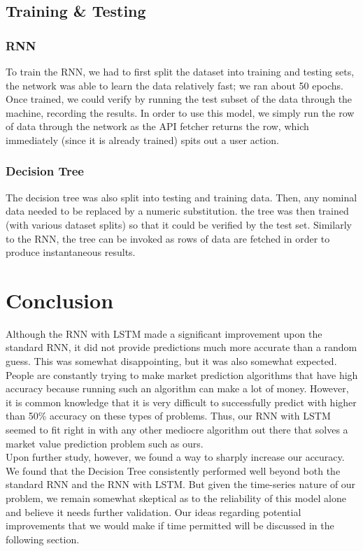 \documentclass{article}
\begin{document}
\subsection{ Training \& Testing }
\subsubsection{ RNN }
To train the RNN, we had to first split the dataset into training and testing sets, the network was able to learn the data relatively fast; we ran about 50 epochs. Once trained, we could verify by running the test subset of the data through the machine, recording the results. In order to use this model, we simply run the row of data through the network as the API fetcher returns the row, which immediately (since it is already trained) spits out a user action.\\

\subsubsection{ Decision Tree }
The decision tree was also split into testing and training data. Then, any nominal data needed to be replaced by a numeric substitution. the tree was then trained (with various dataset splits) so that it could be verified by the test set. Similarly to the RNN, the tree can be invoked as rows of data are fetched in order to produce instantaneous results. \\

\section{ Conclusion }
Although the RNN with LSTM made a significant improvement upon the standard RNN, it did not provide predictions much more accurate than a random guess. This was somewhat disappointing, but it was also somewhat expected. People are constantly trying to make market prediction algorithms that have high accuracy because running such an algorithm can make a lot of money. However, it is common knowledge that it is very difficult to successfully predict with higher than 50\% accuracy on these types of problems. Thus, our RNN with LSTM seemed to fit right in with any other mediocre algorithm out there that solves a market value prediction problem such as ours. \\

Upon further study, however, we found a way to sharply increase our accuracy. We found that the Decision Tree consistently performed well beyond both the standard RNN and the RNN with LSTM. But given the time-series nature of our problem, we remain somewhat skeptical as to the reliability of this model alone and believe it needs further validation. Our ideas regarding potential improvements that we would make if time permitted will be discussed in the following section. \\
\end{document}
